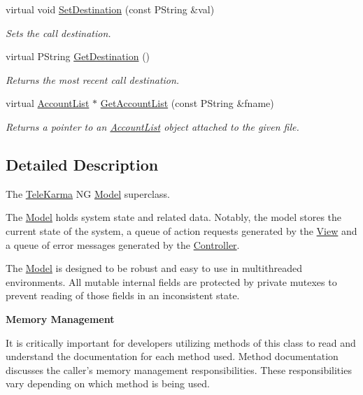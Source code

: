\begin{CompactItemize}
virtual void \hyperlink{classModel_e9a19897ea5d7d2417085a5d3a2a2f72}{SetDestination} (const PString \&val)
\begin{CompactList}\small\item\em Sets the call destination. \item\end{CompactList}\item 
virtual PString \hyperlink{classModel_b4354c982ea5543a43f9dfc0874ece20}{GetDestination} ()
\begin{CompactList}\small\item\em Returns the most recent call destination. \item\end{CompactList}\item 
virtual \hyperlink{classAccountList}{AccountList} $\ast$ \hyperlink{classModel_a0be0a124810faa919249d9a51bde1f4}{GetAccountList} (const PString \&fname)
\begin{CompactList}\small\item\em Returns a pointer to an \hyperlink{classAccountList}{AccountList} object attached to the given file. \item\end{CompactList}\end{CompactItemize}


\subsection{Detailed Description}
The \hyperlink{classTeleKarma}{TeleKarma} NG \hyperlink{classModel}{Model} superclass. 

The \hyperlink{classModel}{Model} holds system state and related data. Notably, the model stores the current state of the system, a queue of action requests generated by the \hyperlink{classView}{View} and a queue of error messages generated by the \hyperlink{classController}{Controller}. 

The \hyperlink{classModel}{Model} is designed to be robust and easy to use in multithreaded environments. All mutable internal fields are protected by private mutexes to prevent reading of those fields in an inconsistent state. 

{\bf Memory Management} 

It is critically important for developers utilizing methods of this class to read and understand the documentation for each method used. Method documentation discusses the caller's memory management responsibilities. These responsibilities vary depending on which method is being used. 

